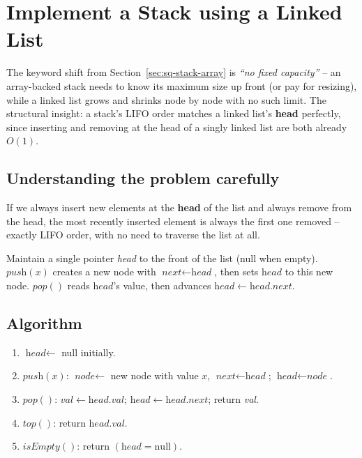 \section{Implement a Stack using a Linked List}
\label{sec:sq-stack-linked-list}


\begin{patternbox}
The keyword shift from Section~\ref{sec:sq-stack-array} is \emph{``no
fixed capacity''} -- an array-backed stack needs to know its maximum size
up front (or pay for resizing), while a linked list grows and shrinks node
by node with no such limit. The structural insight: a stack's LIFO order
matches a linked list's \textbf{head} perfectly, since inserting and
removing at the head of a singly linked list are both already $O(1)$.
\end{patternbox}

\subsection*{Understanding the problem carefully}

If we always insert new elements at the \textbf{head} of the list and
always remove from the head, the most recently inserted element is always
the first one removed -- exactly LIFO order, with no need to traverse the
list at all.

\begin{ideabox}[Head Insertion = Push, Head Removal = Pop]
Maintain a single pointer \textit{head} to the front of the list (null
when empty). $\textit{push}(x)$ creates a new node with $\textit{next}
\gets \textit{head}$, then sets $\textit{head}$ to this new node.
$\textit{pop}()$ reads $\textit{head}$'s value, then advances
$\textit{head} \gets \textit{head}.\textit{next}$.
\end{ideabox}

\subsection*{Algorithm}

\begin{enumerate}
  \item $\textit{head} \gets$ null initially.
  \item $\textit{push}(x)$: $\textit{node} \gets$ new node with value $x$,
        $\textit{next} \gets \textit{head}$; $\textit{head} \gets
        \textit{node}$.
  \item $\textit{pop}()$: $\textit{val} \gets \textit{head}.\textit{val}$;
        $\textit{head} \gets \textit{head}.\textit{next}$; return
        \textit{val}.
  \item $\textit{top}()$: return $\textit{head}.\textit{val}$.
  \item $\textit{isEmpty}()$: return $(\textit{head} = \text{null})$.
\end{enumerate}


